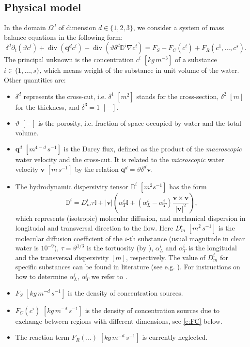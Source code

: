 \documentclass[a4paper]{article}
\def\abs#1{\lvert#1\rvert}
\def\D{{\tn D}}
\def\div{\operatorname{div}}
\def\grad{\nabla}
\def\vc#1{\mathbf{\boldsymbol{#1}}}     %
\def\th{\vartheta}
\def\tn#1{{\mathbb{#1}}}    %
\begin{document}
\subsection{Physical model}
In the domain $\Omega^d$ of dimension $d\in\{1,2,3\}$, we consider a system of mass balance equations in the following form:
\begin{equation}
    \label{e:ADE}
   \delta^d\partial_t ( \th c^i) + \div ( \vc q^d c^i ) - \div (\th \delta^d \D^i \grad c^i ) = F_S + F_C(c^i) + F_R(c^1,\dots, c^s).%
\end{equation}
The principal unknown is the concentration $c^i$ $[kg\,m^{-3}]$ of a substance $i\in\{1,\dots, s\}$, which means weight of the substance in unit volume of the water.
Other quantities are:
\begin{itemize}
\item $\delta^d$ represents the cross-cut, i.e. $\delta^1$ $[m^2]$ stands for the cross-section, $\delta^2$ $[m]$ for the thickness, and $\delta^3=1$ $[-]$.
\item $\th$ $[-]$ is the porosity, i.e. fraction of space occupied by water and the total volume.
\item $\vc q^d$ $[m^{4-d}\,s^{-1}]$ is the Darcy flux, defined as the product of the \emph{macroscopic} water velocity and the cross-cut.
It is related to the \emph{microscopic} water velocity $\vc v$ $[m\,s^{-1}]$ by the relation $\vc q^d = \th\delta^d\vc v$.
\item The hydrodynamic dispersivity tensor $\D^i$ $[m^2 s^{-1}]$ has the form
\[
  \D^i =D_m^i \tau \tn I + \abs{\vc v}\left(\alpha_T^i \tn I + (\alpha_L^i - \alpha_T^i) \frac{\vc v \times \vc v}{\abs{\vc v}^2}\right),
\]
which represents (isotropic) molecular diffusion, and mechanical dispersion in longitudal and transversal direction to the flow.
Here $D_m^i$ $[m^2\,s^{-1}]$ is the molecular diffusion coefficient of the $i$-th substance (usual magnitude in clear water is $10^{-9}$), $\tau=\th^{1/3}$ is the tortuosity (by \cite{millington_quirk}), $\alpha_L^i$ and $\alpha_T^i$ is the longitudal and the transversal dispersivity $[m]$, respectively.
The value of $D_m^i$ for specific substances can be found in literature (see e.g. \cite{cislerova_vogel}).
For instructions on how to determine $\alpha_L^i$, $\alpha_T^i$ we refer to \cite{marsily,domenico_schwartz}.

\item $F_S$ $[kg\,m^{-d}\,s^{-1}]$ is the density of concentration sources.

\item $F_C(c^i)$ $[kg\, m^{-d}\,s^{-1}]$ is the density of concentration sources due to exchange between regions with different dimensions, see \eqref{e:FC} below.

\item The reaction term $F_R(\dots)$ $[kg\,m^{-d}\,s^{-1}]$ is currently neglected.
\end{itemize}
\end{document}
